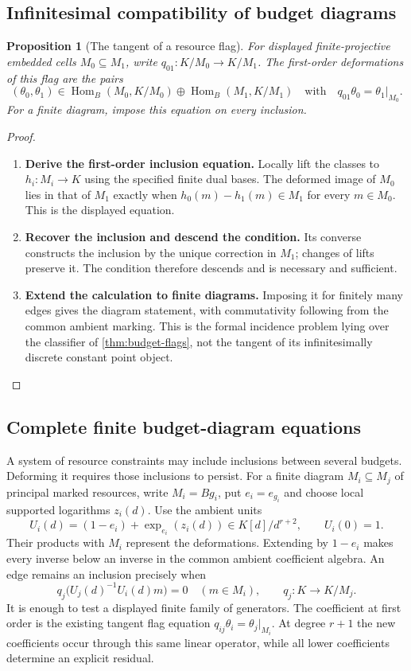 \documentclass[11pt,a4paper]{article}
\numberwithin{algorithm}{section}
\numberwithin{equation}{section}
\newtheorem{proposition}[proposition]{Proposition}
\theoremstyle{definition}
\theoremstyle{remark}
\theoremstyle{plain}
\newcommand{\Hom}{\operatorname{Hom}}
\theoremstyle{definition}
\theoremstyle{plain}
\begin{document}
\subsection{Infinitesimal compatibility of budget diagrams}
\label{sec:flag-deformations}
\begin{proposition}[The tangent of a resource flag]
\label{prop:flag-tangent}
For displayed finite-projective embedded cells $M_0\subseteq M_1$,
write $q_{01}:K/M_0\to K/M_1$. The first-order deformations
of this flag are the pairs
\[
 (\theta_0,\theta_1)\in
 \Hom_B(M_0,K/M_0)\oplus\Hom_B(M_1,K/M_1)
 \quad\text{with}\quad
 q_{01}\theta_0=\theta_1|_{M_0}.
\]
For a finite diagram, impose this equation on every inclusion.
\end{proposition}
\begin{proof}\leavevmode
\begin{enumerate}[leftmargin=*,align=left]
\item \textbf{Derive the first-order inclusion equation.}
Locally lift the classes to $h_i:M_i\to K$ using the specified
finite dual bases. The deformed image of $M_0$
lies in that of $M_1$ exactly when
$h_0(m)-h_1(m)\in M_1$ for every $m\in M_0$.
This is the displayed equation.

\item \textbf{Recover the inclusion and descend the condition.}
Its converse constructs the
inclusion by the unique correction in $M_1$; changes of lifts
preserve it. The condition therefore descends and is necessary
and sufficient.

\item \textbf{Extend the calculation to finite diagrams.}
Imposing it for finitely many edges gives the
diagram statement, with commutativity following from the common
ambient marking. This is the formal incidence problem lying
over the classifier of \cref{thm:budget-flags}, not the tangent
of its infinitesimally discrete constant point object.
\end{enumerate}
\end{proof}

\subsection{Complete finite budget-diagram equations}
\label{sec:formal-flags}
A system of resource constraints may include inclusions between
several budgets. Deforming it requires those inclusions to persist.
For a finite diagram $M_i\subseteq M_j$ of principal marked
resources, write $M_i=Bg_i$, put $e_i=e_{g_i}$ and choose local supported
logarithms $z_i(d)$. Use the ambient units
\[
 U_i(d)=(1-e_i)+\exp_{e_i}(z_i(d))\in K[d]/d^{r+2},
 \qquad U_i(0)=1.
\]
Their products with $M_i$ represent the deformations.
Extending by $1-e_i$ makes every inverse below an inverse
in the common ambient coefficient algebra.
An edge remains an inclusion precisely when
\[
 q_j\bigl(U_j(d)^{-1}U_i(d)m\bigr)=0
 \quad(m\in M_i),\qquad q_j:K\to K/M_j.
\]
It is enough to test a displayed finite family of generators.
The coefficient at first order is the existing tangent flag
equation $q_{ij}\theta_i=\theta_j|_{M_i}$.
At degree $r+1$ the new coefficients occur through this same
linear operator, while all lower coefficients determine an
explicit residual.
\end{document}
